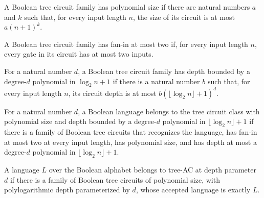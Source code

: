 \begin{definition}
\label{BoolCircuit.TreeCircuitFamily.IsPolySize}
\leanok
{}
A Boolean tree circuit family has polynomial size if there are natural numbers $a$ and
$k$ such that, for every input length $n$, the size of its circuit is at most
$a(n+1)^k$.
\end{definition}

\begin{definition}
\label{BoolCircuit.TreeCircuitFamily.HasFaninTwo}
\leanok
{}
A Boolean tree circuit family has fan-in at most two if, for every input length $n$,
every gate in its circuit has at most two inputs.
\end{definition}

\begin{definition}
\label{BoolCircuit.TreeCircuitFamily.HasPolylogDepth}
\leanok
{}
For a natural number $d$, a Boolean tree circuit family has depth bounded by a
degree-$d$ polynomial in $\log_2 n+1$ if there is a natural number $b$ such that, for
every input length $n$, its circuit depth is at most $b(\lfloor\log_2 n\rfloor+1)^d$.
\end{definition}

\begin{definition}
\label{Language.InTreeNC}
\leanok
{}
For a natural number $d$, a Boolean language belongs to the tree circuit class with
polynomial size and depth bounded by a degree-$d$ polynomial in $\lfloor\log_2 n\rfloor+1$ if
there is a family of Boolean tree circuits that recognizes the language, has fan-in at
most two at every input length, has polynomial size, and has depth at most a degree-$d$
polynomial in $\lfloor\log_2 n\rfloor+1$.
\end{definition}

\begin{definition}
\label{Language.InTreeAC}
\leanok
{}
A language $L$ over the Boolean alphabet belongs to tree-AC at depth parameter $d$ if
there is a family of Boolean tree circuits of polynomial size, with polylogarithmic
depth parameterized by $d$, whose accepted language is exactly $L$.
\end{definition}

